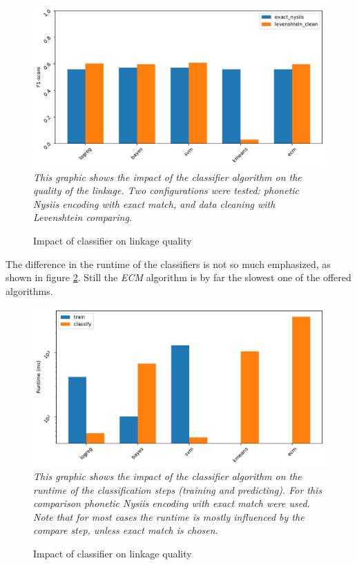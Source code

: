 \documentclass[sigconf,nonacm]{acmart}
\begin{document}
\begin{figure}[h]
\centering
\caption{Impact of classifier on linkage quality}
\label{plot:classifier}
\includegraphics[width=0.9\linewidth]{../figures/eval_classifier}\\[-2mm]
\emph{\small
This graphic shows the impact of the classifier algorithm on the
quality of the linkage.
Two configurations were tested: phonetic Nysiis encoding with
exact match, and data cleaning with Levenshtein comparing.}
\end{figure}

The difference in the runtime of the classifiers is not so much
emphasized, as shown in figure \ref{plot:classifier2}.
Still the \emph{ECM} algorithm is by far the slowest one of the
offered algorithms.

\begin{figure}[h]
\centering
\caption{Impact of classifier on linkage quality}
\label{plot:classifier2}
\includegraphics[width=0.9\linewidth]{../figures/eval_classifier2}\\[-2mm]
\emph{\small
This graphic shows the impact of the classifier algorithm on the
runtime of the classification steps (training and predicting).
For this comparison phonetic Nysiis encoding with
exact match were used.
Note that for most cases the runtime is mostly influenced by the compare step,
unless exact match is chosen.}
\end{figure}
\end{document}
